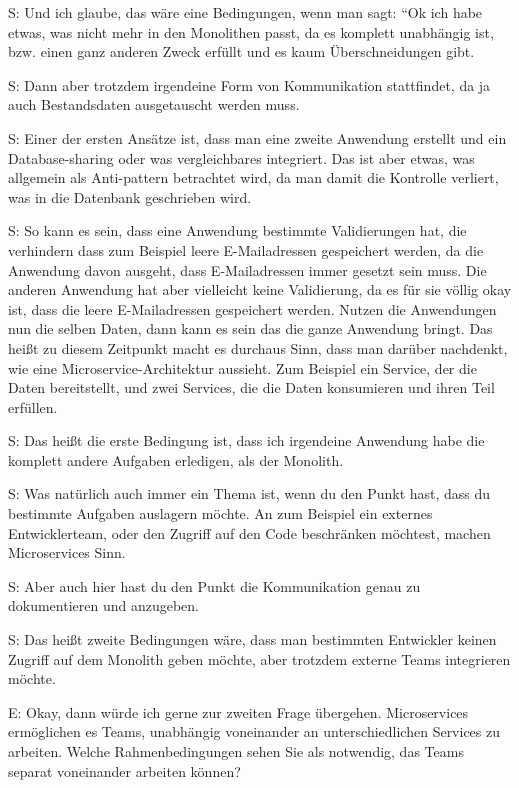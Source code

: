  \label{appendix:s-5}
S: Und ich glaube, das wäre eine Bedingungen, wenn man sagt: “Ok ich habe etwas, was nicht mehr in den Monolithen passt, da es komplett unabhängig ist, bzw. einen ganz anderen Zweck erfüllt und es kaum Überschneidungen gibt.

 \label{appendix:s-6}  \label{appendix:s-7}
S: Dann aber trotzdem irgendeine Form von Kommunikation stattfindet, da ja auch Bestandsdaten ausgetauscht werden muss.

S: Einer der ersten Ansätze ist, dass man eine zweite Anwendung erstellt und ein Database-sharing oder was vergleichbares integriert. Das ist aber etwas, was allgemein als Anti-pattern betrachtet wird, da man damit die Kontrolle verliert, was in die Datenbank geschrieben wird.

 \label{appendix:s-8}
S: So kann es sein, dass eine Anwendung bestimmte Validierungen hat, die verhindern dass zum Beispiel leere E-Mailadressen gespeichert werden, da die Anwendung davon ausgeht, dass E-Mailadressen immer gesetzt sein muss. Die anderen Anwendung hat aber vielleicht keine Validierung, da es für sie völlig okay ist, dass die leere E-Mailadressen gespeichert werden. Nutzen die Anwendungen nun die selben Daten, dann kann es sein das die ganze Anwendung bringt. Das heißt zu diesem Zeitpunkt macht es durchaus Sinn, dass man darüber nachdenkt, wie eine Microservice-Architektur aussieht. Zum Beispiel ein Service, der die Daten bereitstellt, und zwei Services, die die Daten konsumieren und ihren Teil erfüllen.

 \label{appendix:s-9}
S: Das heißt die erste Bedingung ist, dass ich irgendeine Anwendung habe die komplett andere Aufgaben erledigen, als der Monolith.

 \label{appendix:s-10}  \label{appendix:s-11}
S: Was natürlich auch immer ein Thema ist, wenn du den Punkt hast, dass du bestimmte Aufgaben auslagern möchte. An zum Beispiel ein externes Entwicklerteam, oder den Zugriff auf den Code beschränken möchtest, machen Microservices Sinn.

 \label{appendix:s-12}
S: Aber auch hier hast du den Punkt die Kommunikation genau zu dokumentieren und anzugeben.

S: Das heißt zweite Bedingungen wäre, dass man bestimmten Entwickler keinen Zugriff auf dem Monolith geben möchte, aber trotzdem externe Teams integrieren möchte.

E: Okay, dann würde ich gerne zur zweiten Frage übergehen.
Microservices ermöglichen es Teams, unabhängig voneinander an unterschiedlichen Services zu arbeiten. Welche Rahmenbedingungen sehen Sie als notwendig, das Teams separat voneinander arbeiten können? 

